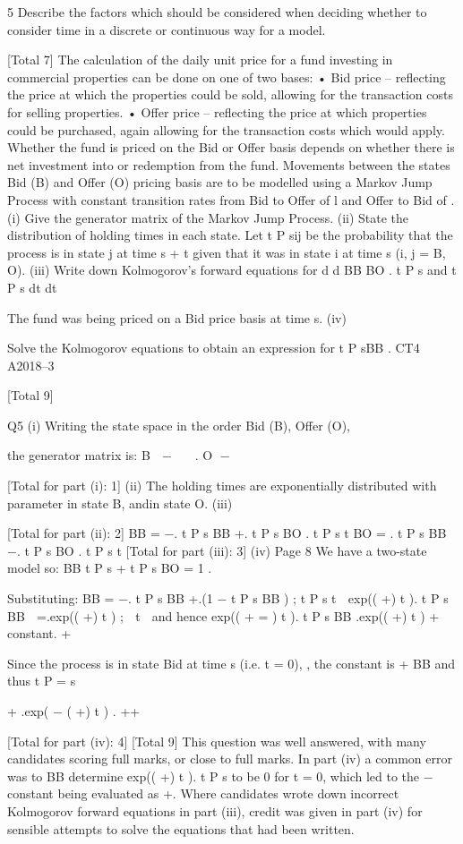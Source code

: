 \documentclass[a4paper,12pt]{article}
\begin{document}
5
Describe the factors which should be considered when deciding whether to
consider time in a discrete or continuous way for a model.

[Total 7]
The calculation of the daily unit price for a fund investing in commercial properties
can be done on one of two bases:
• Bid price – reflecting the price at which the properties could be sold, allowing for
the transaction costs for selling properties.
• Offer price – reflecting the price at which properties could be purchased, again
allowing for the transaction costs which would apply.
Whether the fund is priced on the Bid or Offer basis depends on whether there is net
investment into or redemption from the fund.
Movements between the states Bid (B) and Offer (O) pricing basis are to be modelled
using a Markov Jump Process with constant transition rates from Bid to Offer of l and
Offer to Bid of \mu.
(i) Give the generator matrix of the Markov Jump Process. 
(ii) State the distribution of holding times in each state. 
Let t P sij be the probability that the process is in state j at time s + t given that it was in
state i at time s (i, j = B, O).
(iii)
Write down Kolmogorov’s forward equations for
d
d
BB
BO
. 
t P s and
t P s
dt
dt

The fund was being priced on a Bid price basis at time s.
(iv)

Solve the Kolmogorov equations to obtain an expression for t P sBB . 
CT4 A2018–3 

[Total 9]


Q5
(i)
Writing the state space in the order {Bid (B), Offer (O)},

the generator matrix is:
B  −\lambda \lambda 

 .
O \mu −\mu 

[Total for part (i): 1]
(ii)
The holding times are exponentially distributed with 
parameter \lambda in state B, 
and\mu in state O.
(iii)

[Total for part (ii): 2]
\partial
BB
= −\lambda . t P s BB +\mu . t P s BO .
t P s
\partial t 
\partial
BO
= \lambda . t P s BB −\mu . t P s BO .
t P s
\partial t 
[Total for part (iii): 3]
(iv)
Page 8
We have a two-state model so:
BB
t P s
+ t P s BO =
1 .

Substituting:
\partial
BB
= −\lambda . t P s BB +\mu .(1 − t P s BB ) ;
t P s
\partial t 
\partial 
exp(( \lambda +\mu ) t ). t P s BB  =\mu .exp(( \lambda +\mu ) t ) ;

\partial t  
and hence
exp(( \lambda + \mu
=
) t ). t P s BB
\mu
.exp(( \lambda +\mu ) t ) + constant.
\lambda+\mu

Since the process is in state Bid at time s (i.e. t = 0),
\lambda
,
the constant is
\mu+\lambda
BB
and thus t P
=
s

\mu
\lambda
+
.exp( − ( \lambda +\mu ) t ) .
\lambda+\mu \lambda+\mu

[Total for part (iv): 4]
[Total 9]
This question was well answered, with many candidates scoring full
marks, or close to full marks. In part (iv) a common error was to
BB
determine exp(( \lambda +\mu ) t ). t P s to be 0 for t = 0, which led to the
−\mu
constant being evaluated as \lambda +\mu . Where candidates wrote down
incorrect Kolmogorov forward equations in part (iii), credit was
given in part (iv) for sensible attempts to solve the equations that
had been written.
\end{document}
